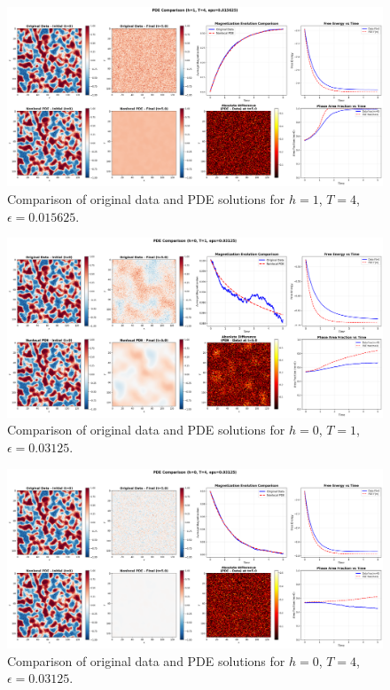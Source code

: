 \documentclass[11pt,a4paper]{article}
\begin{document}
\begin{figure}[!h]
    \centering
    \includegraphics[width=1.0\textwidth]{fig/pde_comparison_h1_T4_eps0.015625.png}
    \caption{Comparison of original data and PDE solutions for $h=1$, $T=4$, $\epsilon=0.015625$.}
    \label{fig:pde_comparison_h1_T4_eps0.015625}
\end{figure}


\begin{figure}[!h]
    \centering
    \includegraphics[width=1.0\textwidth]{fig/pde_comparison_h0_T1_eps0.03125.png}
    \caption{Comparison of original data and PDE solutions for $h=0$, $T=1$, $\epsilon=0.03125$.}
    \label{fig:pde_comparison_h0_T1_eps0.03125}
\end{figure}


\begin{figure}[h]
    \centering
    \includegraphics[width=1.0\textwidth]{fig/pde_comparison_h0_T4_eps0.03125.png}
    \caption{Comparison of original data and PDE solutions for $h=0$, $T=4$, $\epsilon=0.03125$.}
    \label{fig:pde_comparison_h0_T4_eps0.03125}
\end{figure}
\end{document}
